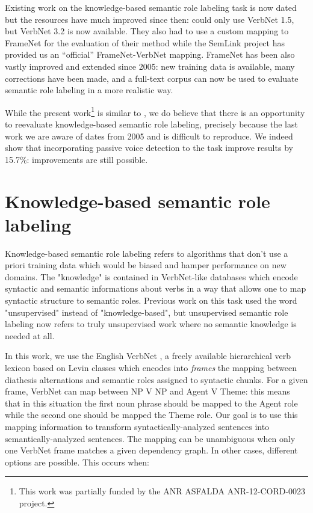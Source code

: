 Existing work on the knowledge-based semantic role labeling task is now dated
but the resources have much improved since then:
\citep{swier2005exploiting} could only use VerbNet 1.5, but VerbNet 3.2 is
now available. They also had to use a custom mapping to FrameNet for the evaluation 
of their method while the SemLink project has provided us an ``official'' 
FrameNet-VerbNet mapping. FrameNet has been also vastly
improved and extended since 2005: new training data is available, many
corrections have been made, and a full-text corpus can now be used to evaluate
semantic role labeling in a more realistic way.

While the present work\footnote{This work was partially funded by the ANR
ASFALDA ANR-12-CORD-0023 project.} is similar to
\citep{swier2005exploiting}, we do believe that there is an opportunity to
reevaluate knowledge-based semantic role labeling, precisely because the last
work we are aware of dates from 2005 and is difficult to reproduce. We indeed
show that incorporating passive voice detection to the task improve results by
15.7\%: improvements are still possible.

\section{Knowledge-based semantic role labeling}
\label{sec:srl}

Knowledge-based semantic role labeling refers to algorithms that don't use a
priori training data which would be biased and hamper performance on new
domains. The "knowledge" is contained in VerbNet-like databases which encode
syntactic and semantic informations about verbs in a way that allows one to map
syntactic structure to semantic roles. Previous work on this task used the word
"unsupervised" instead of "knowledge-based", but unsupervised semantic role
labeling now refers to truly unsupervised work where no semantic knowledge is
needed at all.

In this work, we use the English VerbNet \citep{kipper2006extending}, a
freely available hierarchical verb lexicon based on Levin classes
\citep{levin1993english} which encodes into \emph{frames} the mapping
between diathesis alternations and semantic roles assigned to syntactic chunks.
For a given frame, VerbNet can map between NP V NP and Agent V Theme: this
means that in this situation the first noun phrase should be mapped to the
Agent role while the second one should be mapped the Theme role. Our goal is to
use this mapping information to transform syntactically-analyzed sentences into
semantically-analyzed sentences. The mapping can be unambiguous when only one
VerbNet frame matches a given dependency graph. In other cases, different options are
possible. This occurs when: 

